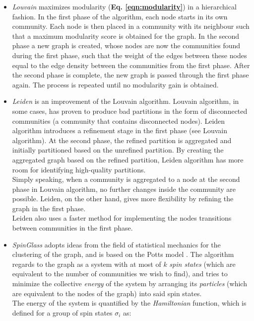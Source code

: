 \begin{itemize}
\item \textit{Louvain}\cite{Blondel_2008} maximizes modularity (\textbf{Eq. \eqref{eqn:modularity}}) in a hierarchical fashion. In the first phase of the algorithm, each node starts in its own community. Each node is then placed in a community with its neighbour such that a maximum modularity score is obtained for the graph. In the second phase a new graph is created, whose nodes are now the communities found during the first phase, such that the weight of the edges between these nodes equal to the edge density between the communities from the first phase. After the second phase is complete, the new graph is passed through the first phase again. The process is repeated until no modularity gain is obtained.

\item \textit{Leiden}\cite{Traag_2019} is an improvement of the Louvain algorithm. Louvain algorithm, in some cases, has proven to produce bad partitions in the form of disconnected communities (a community that contains disconnected nodes). Leiden algorithm introduces a refinement stage in the first phase (see Louvain algorithm). At the second phase, the refined partition is aggregated and initially partitioned based on the unrefined partition. By creating the aggregated graph based on the refined partition, Leiden algorithm has more room for identifying high-quality partitions.\\
Simply speaking, when a community is aggregated to a node at the second phase in Louvain algorithm, no further changes inside the community are possible. Leiden, on the other hand, gives more flexibility by refining the graph in the first phase.\\
Leiden also uses a faster method for implementing the nodes transitions between communities in the first phase.

\item \textit{SpinGlass}\cite{Reichardt_2006} adopts ideas from the field of statistical mechanics for the clustering of the graph, and is based on the Potts model \cite{RevModPhys.54.235}. The algorithm regards to the graph as a system with at most of $k$ \textit{spin states} (which are equivalent to the number of communities we wish to find), and tries to minimize the collective \textit{energy} of the system by arranging its \textit{particles} (which are equivalent to the nodes of the graph) into said spin states. \\ The energy of the system is quantified by the \textit{Hamiltonian} function, which is defined for a group of spin states ${\sigma_{i}}$ as:


\end{itemize}

